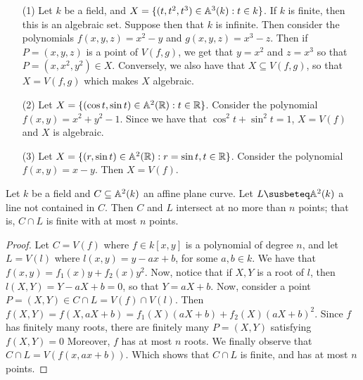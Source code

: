 \begin{example}\label{example_1.6}
    \begin{enumerate}

        \item[(1)] Let $k$ be a field, and  $X=\{(t,t^2,t^3) \in \mathbb{A}^3(k) : t \in
          k\}$. If $k$ is finite, then this is an algebraic set. Suppose then
          that  $k$ is infinite. Then consider the polynomials  $f(x,y,z)=x^2-y$
          and $g(x,y,z)=x^3-z$. Then if $P=(x,y,z)$ is a point of $V(f,g)$, we
          get that  $y=x^2$ and  $z=x^3$ so that  $P=(x,x^2,y^2) \in X$.
          Conversely, we also have that $X \subseteq V(f,g)$, so that $X=V(f,g)$
          which makes $X$ algebraic.

        \item[(2)] Let $X=\{(\cos{t},\sin{t}) \in \mathbb{A}^2(\mathbb{R}) : t \in \mathbb{R}\}$.
            Consider the polynomial $f(x,y)=x^2+y^2-1$. Since we have that
            $\cos^2{t}+\sin^2{t}=1$, $X=V(f)$ and $X$ is algebraic.

        \item[(3)] Let $X=\{(r,\sin{t}) \in \mathbb{A}^2(\mathbb{R}) : r=\sin{t}, t \in \mathbb{R} \}$.
            Consider the polynomial $f(x,y)=x-y$. Then $X=V(f)$.
    \end{enumerate}
\end{example}

\begin{lemma}\label{1.2.2}
    Let $k$ be a field and  $C \subseteq \mathbb{A}^2(k)$ an affine plane curve. Let $L
    \susbeteq \A^2(k)$ a line not contained in $C$. Then $C$ and $L$ intersect
    at no more than $n$ points; that is, $C \cap L$ is finite
    with at most $n$ points.
\end{lemma}
\begin{proof}
    Let $C=V(f)$ where $f \in k[x,y]$ is a polynomial of degree $n$, and let
    $L=V(l)$ where $l(x,y)=y-ax+b$, for some $a,b \in k$. We have that
    $f(x,y)=f_1(x)y+f_2(x)y^2$. Now, notice that if $X,Y$ is a root of $l$, then
    $l(X,Y)=Y-aX+b=0$, so that $Y=aX+b$. Now, consider a point $P=(X,Y) \in C
    \cap L=V(f) \cap V(l)$. Then $f(X,Y)=f(X,aX+b)=f_1(X)(aX+b)+f_2(X)(aX+b)^2$.
    Since $f$ has finitely many roots, there are finitely many $P=(X,Y)$
    satisfying $f(X,Y)=0$ Moreover,  $f$ has at most $n$ roots. We finally
    observe that $C \cap L=V(f(x,ax+b))$. Which shows that $C \cap L$ is finite,
    and has at most $n$ points.
\end{proof}

